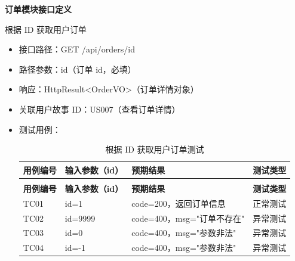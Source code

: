 \begin{levellist}
    \item \textbf{订单模块接口定义}
    \begin{levellist}
        \item 根据 ID 获取用户订单
        \begin{itemize}
            \item 接口路径：GET /api/orders/{id}
            \item 路径参数：id（订单 id，必填）
            \item 响应：HttpResult<OrderVO>（订单详情对象）
            \item 关联用户故事 ID：US007（查看订单详情）
            \item 测试用例：
                  \begin{longtable}{>{\centering\arraybackslash}m{1.7cm} >{\centering\arraybackslash}m{3cm} >{\centering\arraybackslash}m{6.3cm} >{\centering\arraybackslash}m{2cm}}

                      \caption{根据 ID 获取用户订单测试} \label{tab:training}                            \\

                      \toprule
                      \textbf{用例编号} & \textbf{输入参数（id）} & \textbf{预期结果}        & \textbf{测试类型} \\
                      \midrule
                      \endfirsthead

                      \multicolumn{4}{c}{{\tablename\ \thetable{} 续表}}                         \\
                      \toprule
                      \textbf{用例编号} & \textbf{输入参数（id）} & \textbf{预期结果}        & \textbf{测试类型} \\
                      \midrule
                      \endhead

                      \bottomrule
                      \endfoot

                      TC01          & id=1              & code=200，返回订单信息      & 正常测试          \\
                      TC02          & id=9999           & code=400，msg="订单不存在" & 异常测试          \\
                      TC03          & id=0              & code=400，msg="参数非法"  & 异常测试          \\
                      TC04          & id=-1             & code=400，msg="参数非法"  & 异常测试          \\
                  \end{longtable}
        \end{itemize}


\end{levellist}
\end{levellist}
